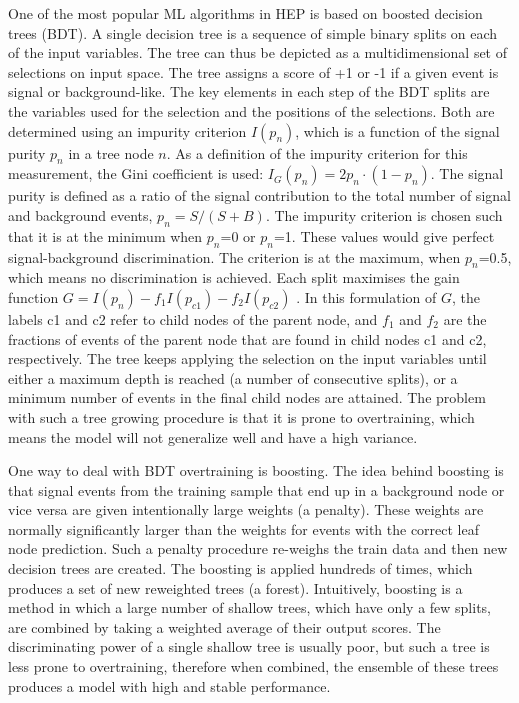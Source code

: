 One of the most popular ML algorithms in HEP is based on boosted decision trees (BDT). A single decision tree is a sequence of simple binary splits on each of the input variables. The tree can thus be depicted as a multidimensional set of selections on input space. The tree assigns a score of +1 or -1 if a given event is signal or background-like. The key elements in each step of the BDT splits are the variables used for the selection and the positions of the selections. Both are determined using an impurity criterion $I(p_n)$, which is a function of the signal purity $p_n$ in a tree node $n$. As a definition of the impurity criterion for this measurement, the Gini coefficient is used: $I_G(p_n) = 2 p_n \cdot (1 - p_n)$. The signal purity is defined as a ratio of the signal contribution to the total number of signal and background events, $p_n = S/(S+B)$. The impurity criterion is chosen such that it is at the minimum when $p_n$=0 or $p_n$=1. These values would give perfect signal-background discrimination. The criterion is at the maximum, when $p_n$=0.5, which means no discrimination is achieved. 
Each split maximises the gain function $G=I(p_n) - f_1I(p_{c1})-f_2I(p_{c2})$ . In this formulation of $G$, the labels c1 and c2 refer to child nodes of the parent node, and $f_1$ and $f_2$ are the fractions of events of the parent node that are found in child nodes c1 and c2, respectively. 
The tree keeps applying the selection on the input variables until either a maximum depth is reached (a number of consecutive splits), or a minimum number of events in the final child nodes are attained. The problem with such a tree growing procedure is that it is prone to overtraining, which means the model will not generalize well and have a high variance. 

One way to deal with BDT overtraining is boosting. The idea behind boosting is that signal events from the training sample that end up in a background node or vice versa are given intentionally large weights (a penalty). These weights are normally significantly larger than the weights for events with the correct leaf node prediction. Such a penalty procedure re-weighs the train data and then new decision trees are created. The boosting is applied hundreds of times, which produces a set of new reweighted trees (a forest). Intuitively, boosting is a method in which a large number of shallow trees, which have only a few splits, are combined by taking a weighted average of their output scores. The discriminating power of a single shallow tree is usually poor, but such a tree is less prone to overtraining, therefore when combined, the ensemble of these trees produces a model with high and stable performance.

